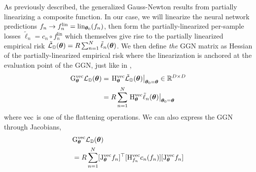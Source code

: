 As previously described, the generalized Gauss-Newton results from partially linearizing a composite function.
In our case, we will linearize the neural network predictions $f_n \to f_n^{\text{lin}} = \lin_{\vtheta_0}(f_n)$, then form the partially-linearized per-sample losses $\tilde{\ell}_n = c_n \circ f_n^{\text{lin}}$ which themselves give rise to the partially linearized empirical risk $\tilde{\gL}_{\sD}(\vtheta) = R \sum_{n=1}^{N} \tilde{\ell}_n(\vtheta)$.
We then define \emph{the} GGN matrix as Hessian of the partially-linearized empirical risk where the linearization is anchored at the evaluation point of the GGN, just like in ,
\begin{align*}
  \ggn^{\vec}_{\vtheta} \gL_{\sD}(\vtheta)
  &=
  \left.\hess_{\vtheta}^{\vec} \tilde{\gL}_{\sD}(\vtheta)\right|_{\vtheta_0 = \vtheta} \in \sR^{D \times D}
    \\
  &=
    R \sum_{n=1}^N
    \left.\hess_{\vtheta}^{\vec} \tilde{\ell}_n(\vtheta)\right|_{\vtheta_0 = \vtheta}
\end{align*}
where $\vec$ is one of the flattening operations.
We can also express the GGN through Jacobians,
\begin{align*}
  &\ggn^{\vec}_{\vtheta} \gL_{\sD}(\vtheta)
  \\
  &=
  R \sum_{n=1}^N
  [\jac_{\vtheta}^{\vec} f_n]^{\top}
  [\hess^{\vec}_{f_n} c_n(f_n)]
  [\jac_{\vtheta}^{\vec} f_n]
\end{align*}

